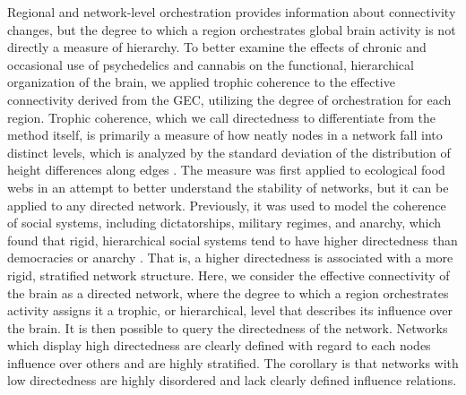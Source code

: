 Regional and network-level orchestration provides information about connectivity changes, but the degree to which a region orchestrates global brain activity is not directly a measure of hierarchy. To better examine the effects of chronic and occasional use of
psychedelics and cannabis on the functional, hierarchical organization
of the brain, we applied trophic coherence to the effective connectivity
derived from the GEC, utilizing the degree of orchestration for each region. Trophic coherence, which we call directedness to differentiate from the method itself, is primarily a measure of how neatly nodes
in a network fall into distinct levels, which is analyzed by the
standard deviation of the distribution of height differences along edges \parencite{Johnson2014,MacKay2020}. The measure was first
applied to ecological food webs in an attempt to better understand the
stability of networks, but it can be applied to any directed network. Previously, it was used to model the coherence of social systems, including dictatorships, military regimes, and anarchy, which found that rigid, hierarchical social systems tend to have higher directedness than democracies or anarchy \parencite{Pilgrim2020}. That is, a higher directedness is associated with a more rigid, stratified network structure.
Here, we consider the effective connectivity of the brain as a directed network, where the degree to which a region orchestrates activity assigns it a trophic, or hierarchical, level that describes its influence over the brain. It is then possible to query the directedness of the network. Networks which display high directedness are clearly defined with regard to each nodes influence over others and are highly stratified. The corollary is that networks with low directedness are highly disordered and lack clearly defined influence relations.

